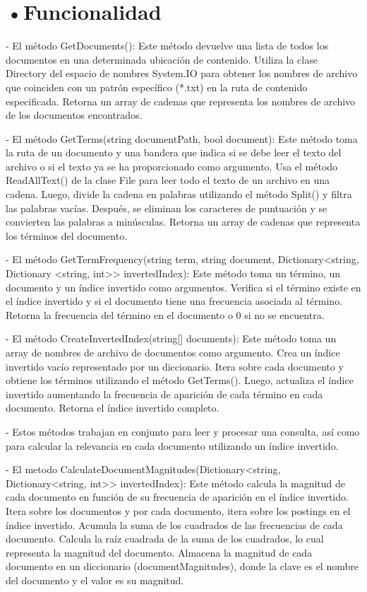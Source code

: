\documentclass[aspectratio = 169, 14pt]{article}
\begin{document}
\section{•Funcionalidad}
\begin{Large}

   
- El método GetDocuments():
Este método devuelve una lista de todos los 
documentos en una determinada ubicación de contenido.
Utiliza la clase Directory del espacio de 
nombres System.IO para obtener los nombres 
de archivo que coinciden con un patrón específico (*.txt) 
en la ruta de contenido especificada.
Retorna un array de cadenas que representa
los nombres de archivo de los documentos encontrados.

- El método GetTerms(string documentPath, bool document):
Este método toma la ruta de un documento y una 
bandera que indica si 
se debe leer el texto del archivo o si el
texto ya se ha proporcionado como argumento.
Usa el método ReadAllText() de la clase 
File para leer todo el texto de un archivo en una cadena.
Luego, divide la cadena en palabras utilizando
el método Split() y filtra las palabras vacías.
Después, se eliminan los caracteres de puntuación
y se convierten las palabras a minúsculas.
Retorna un array de cadenas que representa los 
términos del documento.

- El método GetTermFrequency(string term, 
string document, Dictionary<string, Dictionary
<string, int>> invertedIndex):
Este método toma un término, un documento y 
un índice invertido como argumentos. Verifica si 
el término existe en 
el índice invertido y si el documento tiene una 
frecuencia asociada al término.
Retorna la frecuencia del término en el documento o 
0 si no se encuentra.


- El método CreateInvertedIndex(string[] documents):
Este método toma un array de nombres de archivo de 
documentos como argumento.
Crea un índice invertido vacío representado por un diccionario.
Itera sobre cada documento y obtiene los 
términos utilizando el método GetTerms().
Luego, actualiza el índice invertido aumentando 
la frecuencia de aparición de cada término en cada documento.
Retorna el índice invertido completo.

- Estos métodos trabajan en conjunto para leer y procesar 
una consulta, así como para calcular la relevancia en cada 
documento utilizando un índice invertido.

- El metodo CalculateDocumentMagnitudes(Dictionary<string, 
Dictionary<string, int>> invertedIndex):
Este método calcula la magnitud de cada 
documento en función de su frecuencia de 
aparición en el índice invertido.
Itera sobre los documentos y por cada 
documento, itera sobre los postings en el índice invertido. 
Acumula la suma de los cuadrados de las 
frecuencias de cada documento.
Calcula la raíz cuadrada de la suma de los cuadrados, 
lo cual representa la magnitud del documento.
Almacena la magnitud de cada documento en un diccionario 
(documentMagnitudes), donde la clave es el nombre del 
documento y el valor es su magnitud. 


\end{Large}
\end{document}
